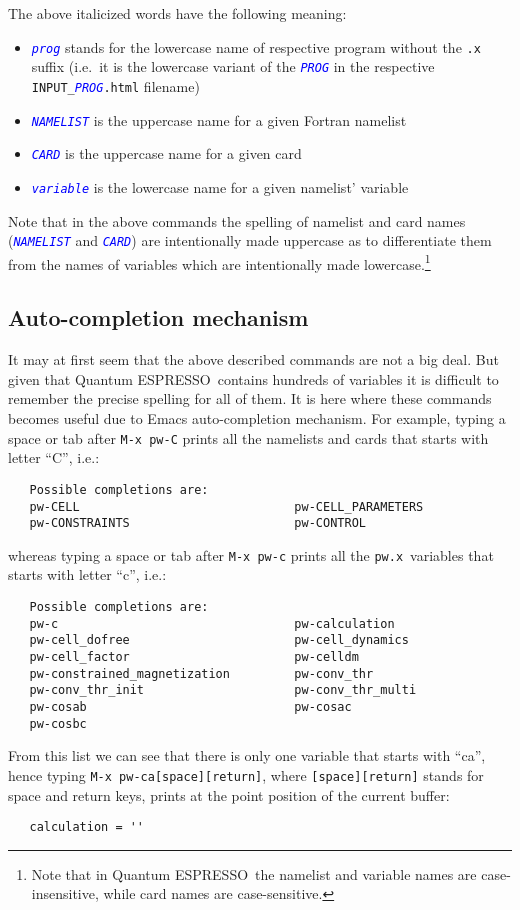 \documentclass[12pt,a4paper]{article}
\def\qe{{\sc Quantum ESPRESSO}}
\def\pwx{\texttt{pw.x}}
\def\var#1{\textcolor{Blue}{\texttt{\textit{#1}}}}
\begin{document}
The above italicized words have the following meaning:
\begin{itemize}
\item \var{prog} stands for the lowercase name of respective program
  without the \texttt{.x} suffix (i.e.\ it is the lowercase variant of
  the \var{PROG} in the respective \texttt{INPUT\_\var{PROG}.html}
  filename)
\item \var{NAMELIST} is the uppercase name for a given Fortran namelist
\item \var{CARD} is the uppercase name for a given card
\item \var{variable} is the lowercase name for a given namelist' variable
\end{itemize}
Note that in the above commands the spelling of namelist and card
names (\var{NAMELIST} and \var{CARD}) are intentionally made uppercase
as to differentiate them from the names of variables which are
intentionally made lowercase.\footnote{Note that in \qe\ the namelist
  and variable names are case-insensitive, while card names are
  case-sensitive.}

\subsection{Auto-completion mechanism}
It may at first seem that the above described commands are not a big
deal. But given that \qe\ contains hundreds of variables it is
difficult to remember the precise spelling for all of them. It is here
where these commands becomes useful due to Emacs auto-completion
mechanism. For example, typing a space or tab after \texttt{M-x pw-C} 
prints all the namelists and cards that starts with letter ``C'', i.e.:
\begin{verbatim}
   Possible completions are:
   pw-CELL                              pw-CELL_PARAMETERS
   pw-CONSTRAINTS                       pw-CONTROL
\end{verbatim}
\noindent whereas typing a space or tab after \texttt{M-x pw-c}
prints all the \pwx\ variables that starts with letter ``c'', i.e.:
\begin{verbatim}
   Possible completions are:
   pw-c                                 pw-calculation
   pw-cell_dofree                       pw-cell_dynamics
   pw-cell_factor                       pw-celldm
   pw-constrained_magnetization         pw-conv_thr
   pw-conv_thr_init                     pw-conv_thr_multi
   pw-cosab                             pw-cosac
   pw-cosbc
\end{verbatim}
\noindent
From this list we can see that there is only one variable that starts
with ``ca'', hence typing \texttt{M-x pw-ca[space][return]}, where
\texttt{[space][return]} stands for space and return keys, prints at
the point position of the current buffer:
\begin{verbatim}
   calculation = ''
\end{verbatim}
\end{document}

